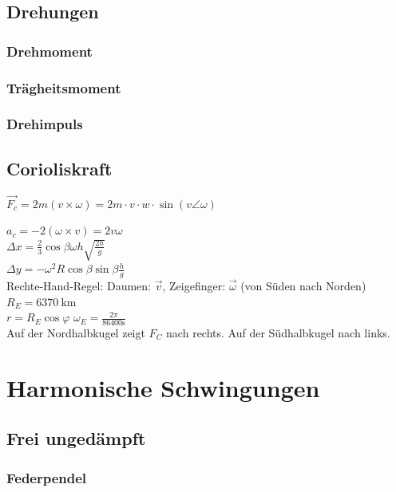 \documentclass[german]{latex4ei/latex4ei_sheet}
\begin{document}
\subsection{Drehungen}
\subsubsection{Drehmoment}
\subsubsection{Trägheitsmoment}
\subsubsection{Drehimpuls}
\begin{sectionbox}
\subsection{Corioliskraft}
\begin{emphbox}
$\vec{F_c}=2m(v\times \omega)= 2m \cdot v \cdot w	\cdot \sin{(v\angle \omega)}$
\end{emphbox}
$a_c=-2(\omega \times v)=2v\omega$\\
$\Delta x= \frac{2}{3}\cos \beta \omega h \sqrt{\frac{2h}{g}}$\\
$\Delta y = -\omega^2R\cos \beta \sin \beta \frac{h}{g}$\\
Rechte-Hand-Regel: Daumen: $\vec{v}$, Zeigefinger: $\vec{\omega}$ (von Süden nach Norden)\\
$R_E=\SI{6370}{\kilo \meter}$\\
$r=R_E \cos \varphi$
$\omega_E=\frac{2\pi}{86400\si{\second}}$\\
Auf der Nordhalbkugel zeigt $F_C$ nach rechts. Auf der Südhalbkugel nach links.
\end{sectionbox}

\section{Harmonische Schwingungen}
\subsection{Frei ungedämpft}
\subsubsection{Federpendel}
\end{document}
